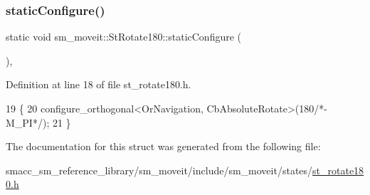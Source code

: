 \subsubsection{\texorpdfstring{static\+Configure()}{staticConfigure()}}
{\footnotesize\ttfamily static void sm\+\_\+moveit\+::\+St\+Rotate180\+::static\+Configure (\begin{DoxyParamCaption}{ }\end{DoxyParamCaption})\hspace{0.3cm}{\ttfamily [inline]}, {\ttfamily [static]}}



Definition at line 18 of file st\+\_\+rotate180.\+h.


\begin{DoxyCode}
19     \{
20         configure\_orthogonal<OrNavigation, CbAbsoluteRotate>(180\textcolor{comment}{/*-M\_PI*/});
21     \}
\end{DoxyCode}


The documentation for this struct was generated from the following file\+:\begin{DoxyCompactItemize}
\item 
smacc\+\_\+sm\+\_\+reference\+\_\+library/sm\+\_\+moveit/include/sm\+\_\+moveit/states/\hyperlink{st__rotate180_8h}{st\+\_\+rotate180.\+h}\end{DoxyCompactItemize}
